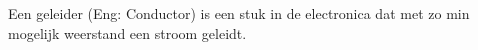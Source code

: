 Een geleider (Eng: Conductor) is een stuk in de electronica dat met zo min mogelijk weerstand een stroom geleidt.
